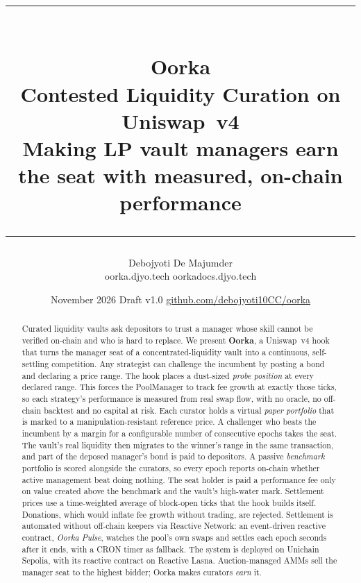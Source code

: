 \documentclass[11pt,a4paper]{article}
\title{%
  \vspace{-1.2cm}
  {\color{accent}\rule{\linewidth}{1.2pt}}\\[0.6em]
  {\Huge\bfseries\color{ink} Oorka}\\[0.4em]
  {\Large\color{ink} Contested Liquidity Curation on Uniswap~v4}\\[0.3em]
  {\normalsize\color{ink2} Making LP vault managers earn the seat with measured, on-chain performance}\\[0.2em]
  {\color{accent}\rule{\linewidth}{1.2pt}}
}
\author{Debojyoti De Majumder\\{\small\color{ink2}oorka.djyo.tech \textperiodcentered{} oorkadocs.djyo.tech}}
\date{\small November 2026 \textperiodcentered{} Draft v1.0 \textperiodcentered{} \href{https://github.com/debojyoti10CC/oorka}{github.com/debojyoti10CC/oorka}}
\begin{document}
\maketitle
\thispagestyle{empty}

\begin{abstract}
\noindent
Curated liquidity vaults ask depositors to trust a manager whose skill cannot be verified on-chain and who is hard to replace. We present \textbf{Oorka}, a Uniswap~v4 hook that turns the manager seat of a concentrated-liquidity vault into a continuous, self-settling competition. Any strategist can challenge the incumbent by posting a bond and declaring a price range. The hook places a dust-sized \emph{probe position} at every declared range. This forces the PoolManager to track fee growth at exactly those ticks, so each strategy's performance is measured from real swap flow, with no oracle, no off-chain backtest and no capital at risk. Each curator holds a virtual \emph{paper portfolio} that is marked to a manipulation-resistant reference price. A challenger who beats the incumbent by a margin for a configurable number of consecutive epochs takes the seat. The vault's real liquidity then migrates to the winner's range in the same transaction, and part of the deposed manager's bond is paid to depositors. A passive \emph{benchmark} portfolio is scored alongside the curators, so every epoch reports on-chain whether active management beat doing nothing. The seat holder is paid a performance fee only on value created above the benchmark and the vault's high-water mark. Settlement prices use a time-weighted average of block-open ticks that the hook builds itself. Donations, which would inflate fee growth without trading, are rejected. Settlement is automated without off-chain keepers via Reactive Network: an event-driven reactive contract, \emph{Oorka Pulse}, watches the pool's own swaps and settles each epoch seconds after it ends, with a CRON timer as fallback. The system is deployed on Unichain Sepolia, with its reactive contract on Reactive Lasna. Auction-managed AMMs sell the manager seat to the highest bidder; Oorka makes curators \emph{earn} it.
\end{abstract}
\end{document}
